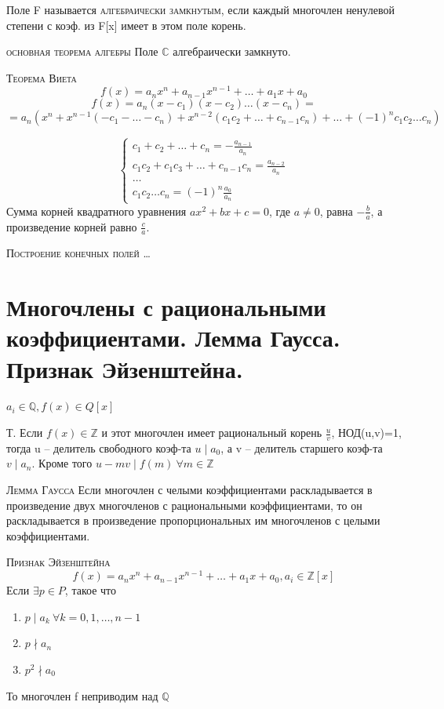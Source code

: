 \documentclass{article}
\begin{document}
Поле F называется \textsc{алгебраически замкнутым}, если каждый многочлен ненулевой степени с коэф. из F[x] имеет в этом поле корень.

\textsc{основная теорема алгебры}
Поле $\mathbb{C}$ алгебраически замкнуто.

\textsc{Теорема Виета}
$$f(x)=a_nx^n+a_{n-1}x^{n-1}+\dots+a_1x+a_0$$
$$f(x)=a_n(x-c_1)(x-c_2)\dots(x-c_n)=$$
$$=a_n(x^n+x^{n-1}(-c_1-\dots-c_n)+x^{n-2}(c_1c_2+\dots+c_{n-1}c_n)+\dots+(-1)^nc_1c_2\dots c_n)$$

\begin{equation*}
    \begin{cases}
        c_1+c_2+\dots+c_n=-\frac{a_{n-1}}{a_n} \\
        c_1c_2+c_1c_3+\dots+c_{n-1}c_n=\frac{a_{n-2}}{a_n} \\
        \dots \\
        c_1c_2\dots c_n=(-1)^n\frac{a_0}{a_n}
    \end{cases}
\end{equation*}
Сумма корней квадратного уравнения $ax^2+bx+c=0$, где $a \neq 0$, равна $-\frac{{b}}{{a}}$, а произведение корней равно $\frac{{c}}{{a}}$.

\textsc{Построение конечных полей}
\dots

\section{Многочлены с рациональными коэффициентами. Лемма Гаусса. Признак Эйзенштейна.}

$a_i\in \mathbb{Q}, f(x)\in Q[x]$

Т. Если $f(x)\in \mathbb{Z}$ и этот многочлен имеет рациональный корень $\frac{u}{v}$, НОД(u,v)=1, тогда u – делитель
свободного коэф-та $u\mid a_0$, а v – делитель старшего коэф-та $v\mid a_n$. Кроме того $u-mv\mid f(m)\ \forall m\in \mathbb{Z}$

\textsc{Лемма Гаусса}
Если многочлен с челыми коэффициентами раскладывается в произведение двух многочленов с рациональными коэффициентами, то он раскладывается в произведение пропорциональных им многочленов с целыми коэффициентами.

\textsc{Признак Эйзенштейна}
$$f(x)=a_nx^n+a_{n-1}x^{n-1}+\dots+a_1x+a_0, a_i\in \mathbb{Z}[x]$$
Если $\exists p\in P$, такое что
\begin{enumerate}
    \item $p\mid a_k\ \forall k=0,1,\dots,n-1$
    \item $p\nmid a_n$
    \item $p^2\nmid a_0$
\end{enumerate}
То многочлен f неприводим над $\mathbb{Q}$
\end{document}
